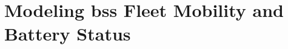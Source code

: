 \chapter[Modeling BSS Fleet Mobility and Battery Status]{Modeling \ac{bss} Fleet Mobility and Battery Status}
\label{ch:results_mobility_and_battery_modeling}




